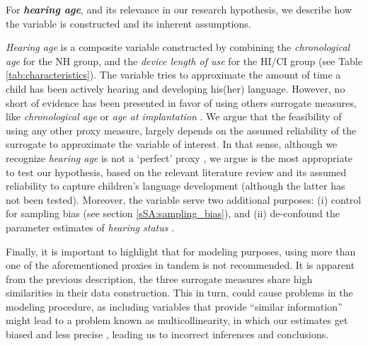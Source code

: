 For \textbf{\textit{hearing age}}, and its relevance in our research hypothesis, we describe how the variable is constructed and its inherent assumptions. 

\textit{Hearing age} is a composite variable constructed by combining the \textit{chronological age} for the NH group, and the \textit{device length of use} for the HI/CI group \citep{Faes_et_al_2021} (see Table \ref{tab:characteristics}). The variable tries to approximate the amount of time a child has been actively hearing and developing his(her) language. However, no short of evidence has been presented in favor of using others surrogate measures, like \textit{chronological age} \cite{Flipsen_et_al_2006, Habib_et_al_2010, Grandon_et_al_2020} or \textit{age at implantation} \cite{Niparko_et_al_2010, Boons_et_al_2012, Bruijnzeel_et_al_2016, Dettman_et_al_2016}. We argue that the feasibility of using any other proxy measure, largely depends on the assumed reliability of the surrogate to approximate the variable of interest. In that sense, although we recognize \textit{hearing age} is not a `perfect' proxy \cite{Faes_et_al_2021}, we argue is the most appropriate to test our hypothesis, based on the relevant literature review and its assumed reliability to capture children's language development (although the latter has not been tested). Moreover, the variable serve two additional purposes: (i) control for sampling bias (see section \ref{sSA:sampling_bias}), and (ii) de-confound the parameter estimates of \textit{hearing status} \cite{Cinelli_et_al_2021}.

Finally, it is important to highlight that for modeling purposes, using more than one of the aforementioned proxies in tandem is not recommended. It is apparent from the previous description, the three surrogate measures share high similarities in their data construction. This in turn, could cause problems in the modeling procedure, as including variables that provide ``similar information'' might lead to a problem known as multicollinearity, in which our estimates get biased and less precise \cite{Farrar_et_al_1967}, leading us to incorrect inferences and conclusions.
%
\begin{comment}
	for the NH group uses the child's \textit{age} (at recording), the method cannot use the same variable for the other two groups. This is due to the fact that \textit{age} is merely used as a proxy, for the amount of time a child has been developing his(her) language. In that sense, more appropriate variables to use under the HI/CI group would be e.g. the \textit{device length of use}, which approximates the ``hearing age'' of such children, or their \textit{vocabulary size}, which resembles their "lexical age" \citep{Faes_et_al_2021}. For this research, we consider the \textit{device length of use} as the simplest one to implement.
\end{comment}

